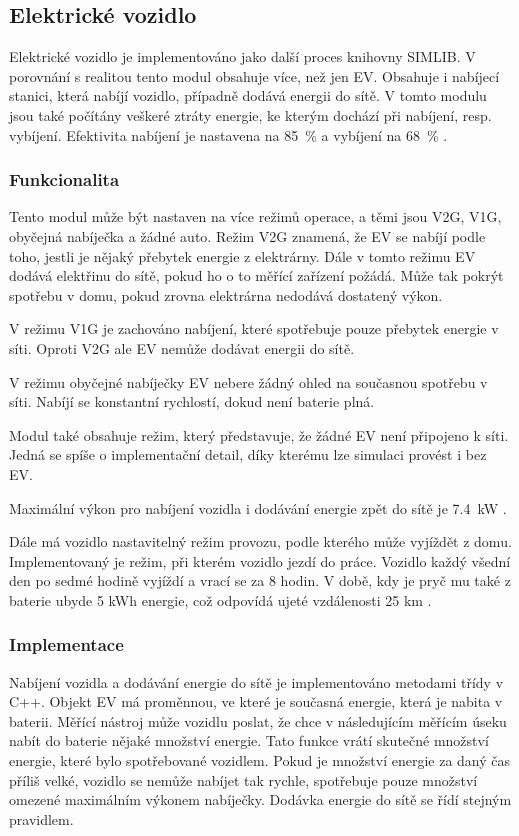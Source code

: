 \documentclass[12pt,a4paper]{article}
\begin{document}
\subsection{Elektrické vozidlo}
Elektrické vozidlo je implementováno jako další proces knihovny SIMLIB.
V porovnání s realitou tento modul obsahuje více, než jen EV.
Obsahuje i nabíjecí stanici, která nabíjí vozidlo, případně dodává energii do sítě.
V tomto modulu jsou také počítány veškeré ztráty energie, ke kterým dochází při nabíjení, resp. vybíjení.
Efektivita nabíjení je nastavena na 85~\% a vybíjení na 68~\% \cite{Shirazi-2018}.

\subsubsection{Funkcionalita}
Tento modul může být nastaven na více režimů operace, a těmi jsou V2G, V1G, obyčejná nabíječka a žádné auto.
Režim V2G znamená, že EV se nabíjí podle toho, jestli je nějaký přebytek energie z elektrárny.
Dále v tomto režimu EV dodává elektřinu do sítě, pokud ho o to měřící zařízení požádá.
Může tak pokrýt spotřebu v domu, pokud zrovna elektrárna nedodává dostatený výkon.

V režimu V1G je zachováno nabíjení, které spotřebuje pouze přebytek energie v síti.
Oproti V2G ale EV nemůže dodávat energii do sítě.

V režimu obyčejné nabíječky EV nebere žádný ohled na současnou spotřebu v síti.
Nabíjí se konstantní rychlostí, dokud není baterie plná.

Modul také obsahuje režim, který představuje, že žádné EV není připojeno k síti.
Jedná se spíše o implementační detail, díky kterému lze simulaci provést i bez EV.

Maximální výkon pro nabíjení vozidla i dodávání energie zpět do sítě je 7.4~kW \cite{Svarc-2022}.

Dále má vozidlo nastavitelný režim provozu, podle kterého může vyjíždět z domu.
Implementovaný je režim, při kterém vozidlo jezdí do práce.
Vozidlo každý všední den po sedmé hodině vyjíždí a vrací se za 8 hodin.
V době, kdy je pryč mu také z baterie ubyde 5 kWh energie,
což odpovídá ujeté vzdálenosti 25 km \cite{ev-database-2022}.

\subsubsection{Implementace}
Nabíjení vozidla a dodávání energie do sítě je implementováno metodami třídy v C++.
Objekt EV má proměnnou, ve které je současná energie, která je nabita v baterii.
Měřící nástroj může vozidlu poslat, že chce v následujícím měřícím úseku nabít do baterie nějaké množství energie.
Tato funkce vrátí skutečné množství energie, které bylo spotřebované vozidlem.
Pokud je množství energie za daný čas příliš velké,
vozidlo se nemůže nabíjet tak rychle, spotřebuje pouze množství omezené maximálním výkonem nabíječky.
Dodávka energie do sítě se řídí stejným pravidlem.
\end{document}
